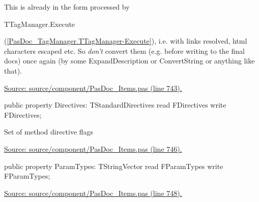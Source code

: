 \documentclass{report}
\newif\ifpdf
\begin{document}
\begin{list}{}
This is already in the form processed by \begin{ttfamily}TTagManager.Execute\end{ttfamily}(\ref{PasDoc_TagManager.TTagManager-Execute}), i.e. with links resolved, html characters escaped etc. So \textit{don't} convert them (e.g. before writing to the final docs) once again (by some ExpandDescription or ConvertString or anything like that).\par
\href{https://github.com/pasdoc/pasdoc/blob/master/source/component/PasDoc_Items.pas#L743}{Source: source/component/PasDoc{\_}Items.pas (line 743).}\label{PasDoc_Items.TPasRoutine-Directives}
\item[\textbf{Directives}\hfill]
\ifpdf
\begin{flushleft}
\fi
\begin{ttfamily}
public property Directives: TStandardDirectives read FDirectives write FDirectives;\end{ttfamily}

\ifpdf
\end{flushleft}
\fi


\par Set of method directive flags\par
\href{https://github.com/pasdoc/pasdoc/blob/master/source/component/PasDoc_Items.pas#L746}{Source: source/component/PasDoc{\_}Items.pas (line 746).}\label{PasDoc_Items.TPasRoutine-ParamTypes}
\item[\textbf{ParamTypes}\hfill]
\ifpdf
\begin{flushleft}
\fi
\begin{ttfamily}
public property ParamTypes: TStringVector read FParamTypes write FParamTypes;\end{ttfamily}

\ifpdf
\end{flushleft}
\fi


\par  \par
\href{https://github.com/pasdoc/pasdoc/blob/master/source/component/PasDoc_Items.pas#L748}{Source: source/component/PasDoc{\_}Items.pas (line 748).}\end{list}
\end{document}
